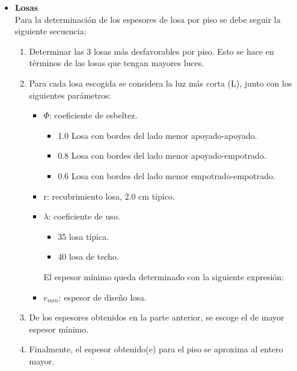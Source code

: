 \documentclass[letterpaper,11pt]{article} %
\begin{document}
\begin{itemize}
        \item \textbf{Losas}\\
        Para la determinación de los espesores de losa por piso se debe seguir la siguiente secuencia:
        \begin{enumerate}
            \item Determinar las 3 losas más desfavorables por piso. Esto se hace en términos de las losas que tengan mayores luces.
            \item Para cada losa escogida se considera la luz más corta (L), junto con los siguientes parámetros:
            \begin{itemize}
                \item $\Phi$: coeficiente de esbeltez.
                    \begin{itemize}
                        \item 1.0 Losa con bordes del lado menor apoyado-apoyado.
                        \item 0.8 Losa con bordes del lado menor apoyado-empotrado.
                        \item 0.6 Losa con bordes del lado menor empotrado-empotrado.
                    \end{itemize}
                \item r: recubrimiento losa, 2.0 cm típico.
                \item $\lambda$: coeficiente de uso.
                    \begin{itemize}
                        \item 35 losa típica.
                        \item 40 losa de techo.
                    \end{itemize}
                El espesor mínimo queda determinado con la siguiente expresión:
                \item $e_{min}$: espesor de diseño losa.
                

            \end{itemize}
            \item De los espesores obtenidos en la parte anterior, se escoge el de mayor espesor mínimo.
            \item Finalmente, el espesor obtenido(e) para el piso se aproxima al entero mayor.
        \end{enumerate}
        
    \end{itemize}
\end{document}
